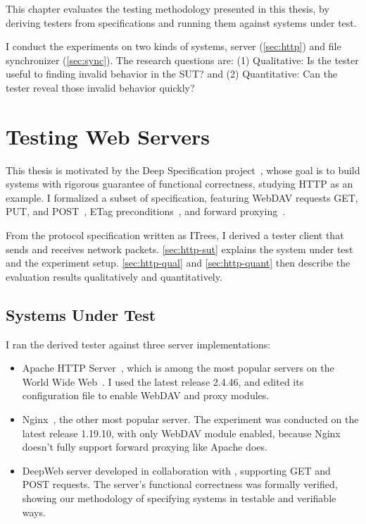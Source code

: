This chapter evaluates the testing methodology presented in this thesis, by
deriving testers from specifications and running them against systems under
test.  

I conduct the experiments on two kinds of systems, \http server
(\autoref{sec:http}) and file synchronizer (\autoref{sec:sync}).  The research
questions are: (1) Qualitative: Is the tester useful to finding invalid behavior
in the SUT? and (2) Quantitative: Can the tester reveal those invalid behavior
quickly?

\section{Testing Web Servers}
\label{sec:http}

This thesis is motivated by the Deep Specification project~\cite{deepspec},
whose goal is to build systems with rigorous guarantee of functional
correctness, studying HTTP as an example.  I formalized a subset of \http
specification, featuring WebDAV requests GET, PUT, and POST~\cite{rfc4918}, ETag
preconditions~\cite{rfc7232}, and forward proxying~\cite{rfc7231}.

From the protocol specification written as ITrees, I derived a tester client
that sends and receives network packets.  \autoref{sec:http-sut} explains the
system under test and the experiment setup.  \autoref{sec:http-qual} and
\autoref{sec:http-quant} then describe the evaluation results qualitatively and
quantitatively.

\subsection{Systems Under Test}
\label{sec:http-sut}
I ran the derived tester against three server implementations:

\begin{itemize}
\item Apache HTTP Server~\cite{Apache}, which is among the most popular servers
  on the World Wide Web~\cite{http-netcraft,http-stats}.  I used the latest
  release 2.4.46, and edited its configuration file to enable WebDAV and proxy
  modules.
\item Nginx~\cite{nginx}, the other most popular server.  The experiment was
  conducted on the latest release 1.19.10, with only WebDAV module enabled,
  because Nginx doesn't fully support forward proxying like Apache does.
\item DeepWeb server developed in collaboration with \citet{itp21}, supporting
  GET and POST requests.  The server's functional correctness was formally
  verified, showing our methodology of specifying systems in testable and
  verifiable ways.
\end{itemize}

